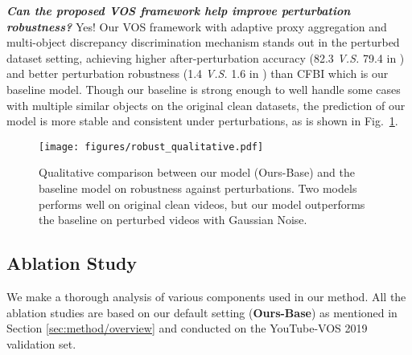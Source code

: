 \documentclass[sigconf]{acmart}
\begin{document}
\noindent\textbf{\textit{Can the proposed VOS framework help improve perturbation robustness?}} Yes! Our VOS framework with adaptive proxy aggregation and multi-object discrepancy discrimination mechanism stands out in the perturbed dataset setting, achieving higher after-perturbation accuracy  (82.3 \textit{V.S.} 79.4 in ) and better perturbation robustness  (1.4 \textit{V.S.} 1.6 in ) than CFBI which is our baseline model. Though our baseline is strong enough to well handle some cases with multiple similar objects on the original clean datasets, the prediction of our model is more stable and consistent under perturbations, as is shown in Fig.~\ref{fig:qualitative_robust}.
\begin{figure}[t]
\centering
\texttt{[image: figures/robust\_qualitative.pdf]}

\caption{Qualitative comparison between our model (Ours-Base) and the baseline model \cite{yang2020collaborative} on robustness against perturbations. Two models performs well on original clean videos, but our model outperforms the baseline on perturbed videos with Gaussian Noise.}
\label{fig:qualitative_robust}                   
\end{figure}
 
\subsection{Ablation Study}
\label{sec:ablation_study}
We make a thorough analysis of various components used in our method.
All the ablation studies 
    are based on our default setting (\textbf{Ours-Base}) as mentioned in Section \ref{sec:method/overview} and conducted on the YouTube-VOS 2019 validation set.
\end{document}
